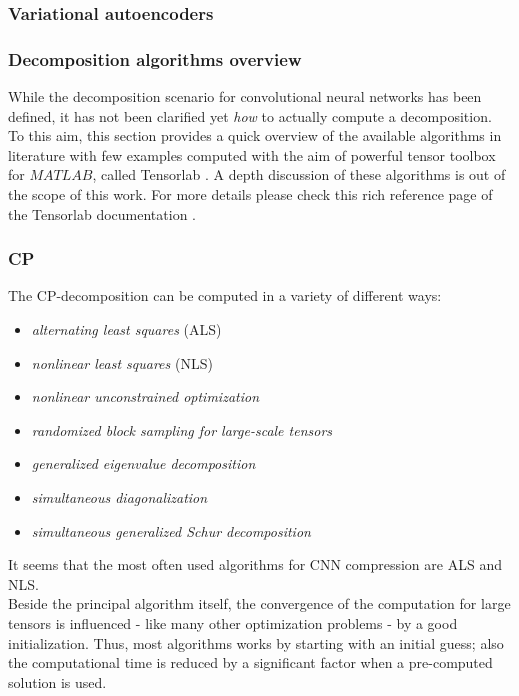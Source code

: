 \subsubsection{Variational autoencoders}


\subsubsection{Decomposition algorithms overview}
While the decomposition scenario for convolutional neural networks has been defined, it has not been clarified yet \emph{how} to actually compute a decomposition. To this aim, this section provides a quick overview of the available algorithms in literature with few examples computed with the aim of powerful tensor toolbox for $MATLAB$, called Tensorlab \parencite{WTensorlab}. \newline
A depth discussion of these algorithms is out of the scope of this work. For more details please check this rich reference page of the Tensorlab documentation \parencite{WTensorlab-ref}.

\subsubsection{CP}
The CP-decomposition can be computed in a variety of different ways: 
    \begin{itemize}
        \item \emph{alternating least squares} (ALS)
        \item \emph{nonlinear least squares} (NLS)
        \item \emph{nonlinear unconstrained optimization}
        \item \emph{randomized block sampling for large-scale tensors}
        \item \emph{generalized eigenvalue decomposition}
        \item \emph{simultaneous diagonalization}
        \item \emph{simultaneous generalized Schur decomposition}
\end{itemize}
It seems that the most often used algorithms for CNN compression are ALS and NLS. \\
Beside the principal algorithm itself, the convergence of the computation for large tensors is influenced - like many other optimization problems - by a good initialization. Thus, most algorithms works by starting with an initial guess; also the computational time is reduced by a significant factor when a pre-computed solution is used. 
\newline

